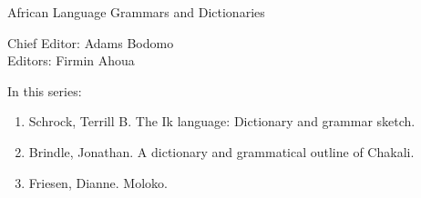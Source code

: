{\large African Language Grammars and Dictionaries}

\bigskip

Chief Editor:    Adams Bodomo \\
Editors:        Firmin Ahoua

\bigskip

In this series:

\begin{enumerate}
\item Schrock, Terrill B. The Ik language: Dictionary and grammar sketch.
\item Brindle, Jonathan. A dictionary and grammatical outline of Chakali.
\item Friesen, Dianne. Moloko.
\end{enumerate}


\vfill

